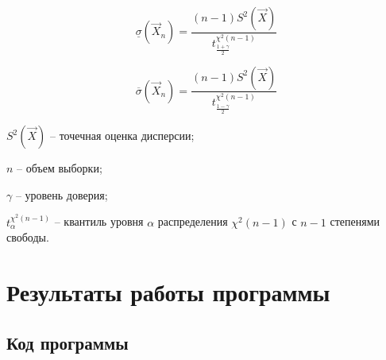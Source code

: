 \documentclass[12pt]{report}
\begin{document}
\begin{equation}
\underline\sigma(\vec X_n)= \frac{(n-1)S^2(\vec X)}{t^{\chi^2(n-1)}_{\frac{1+\gamma}{2}}}
\end{equation}

\begin{equation}
\overline\sigma(\vec X_n)= \frac{(n-1)S^2(\vec X)}{t^{\chi^2(n-1)}_{\frac{1-\gamma}{2}}}
\end{equation}

$S^2(\vec X)$ -- точечная оценка дисперсии;

$n$ -- объем выборки;

$\gamma$ -- уровень доверия;

$t^{\chi^2(n-1)}_{\alpha}$ -- квантиль уровня $\alpha$ распределения $\chi^2(n-1)$ с $n - 1$ степенями свободы.


\chapter*{Результаты работы программы}

\section*{Код программы}
\end{document}
